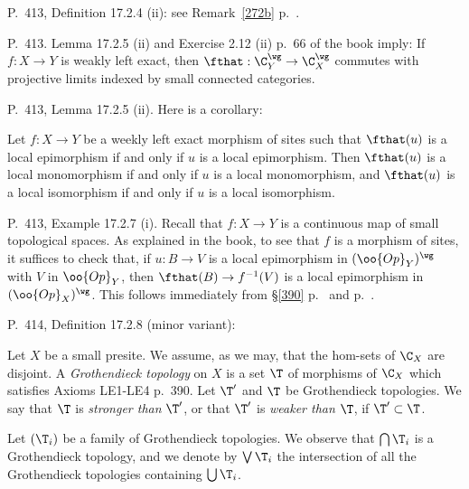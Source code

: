 \documentclass[12pt]{article}
\theoremstyle{remark}
\theoremstyle{definition}
\begin{document}
%

\begin{s}
P.~413, Definition 17.2.4 (ii): see  Remark~\ref{272b} p.~.
\end{s}

%

\begin{s}
P.~413. Lemma 17.2.5 (ii) and Exercise 2.12 (ii) p.~66 of the book imply: If $f:X\to Y$ is weakly left exact, then $\fthat:\C_Y^\wg\to\C_X^\wg$ commutes with projective limits indexed by small connected categories.
\end{s} 

%

\begin{s} 
P.~413, Lemma 17.2.5 (ii). Here is a corollary: 

Let $f:X\to Y$ be a weekly left exact morphism of sites such that $\fthat(u)$ is a local epimorphism if and only if $u$ is a local epimorphism. Then $\fthat(u)$ is a local monomorphism if and only if $u$ is a local monomorphism, and $\fthat(u)$ is a local isomorphism if and only if $u$ is a local isomorphism. 
\end{s} 

%

\begin{s}
P.~413, Example 17.2.7 (i). Recall that $f:X\to Y$ is a continuous map of small topological spaces. As explained in the book, to see that $f$ is a morphism of sites, it suffices to check that, if $u:B\to V$ is a local epimorphism in $(\oo{Op}_Y)^\wg$ with $V$ in $\oo{Op}_Y$, then $\fthat(B)\to f^{-1}(V)$ is a local epimorphism in $(\oo{Op}_X)^\wg$. This follows immediately from \S\ref{390} p.~ and  p.~. 
\end{s}

%

\begin{s} 
P.~414, Definition 17.2.8 (minor variant):

\begin{df} 
Let $X$ be a small presite. We assume, as we may, that the hom-sets of $\C_X$ are disjoint. A {\em Grothendieck topology} on $X$ is a set $\T$ of morphisms of $\C_X$ which satisfies Axioms LE1-LE4 p.~390. Let $\T'$ and $\T$ be Grothendieck topologies. We say that $\T$ is {\em stronger than} $\T'$, or that $\T'$ is {\em weaker than} $\T$, if $\T'\subset\T$. 
\end{df}

Let $(\T_i)$ be a family of Grothendieck topologies. We observe that $\bigcap\T_i$ is a Grothendieck topology, and we denote by $\bigvee\T_i$ the intersection of all the Grothendieck topologies containing $\bigcup\T_i$.
\end{s}
\end{document}
